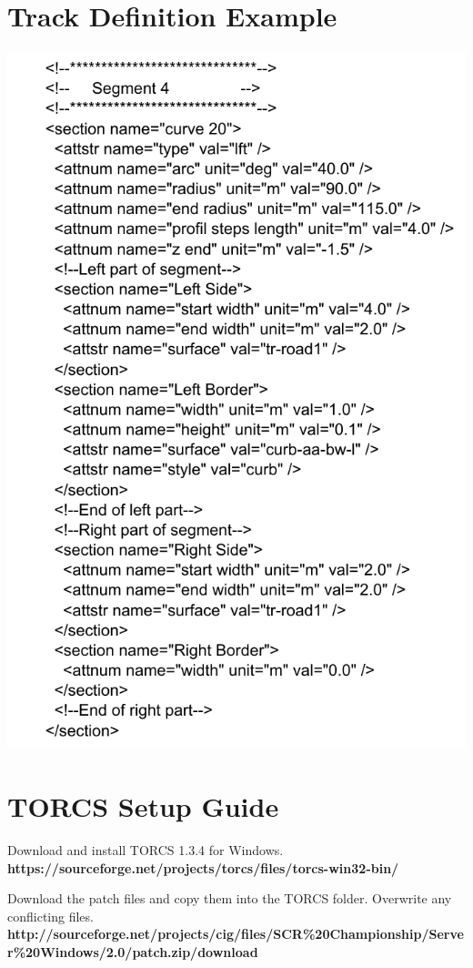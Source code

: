 \documentclass[conference]{IEEEtran}
\begin{document}
\begin{appendices}
\section{Track Definition Example}
\label{apx-track}
\includegraphics[width=\columnwidth]{trackdef.pdf}

\section{TORCS Setup Guide}
Download and install TORCS 1.3.4 for Windows.\\
\textbf{https://sourceforge.net/projects/torcs/files/torcs-win32-bin/}

Download the patch files and copy them into the TORCS folder. Overwrite any conflicting files.\\
\textbf{http://sourceforge.net/projects/cig/files/SCR\%20Championship/Server\%20Windows/2.0/patch.zip/download}


\end{appendices}
\end{document}
